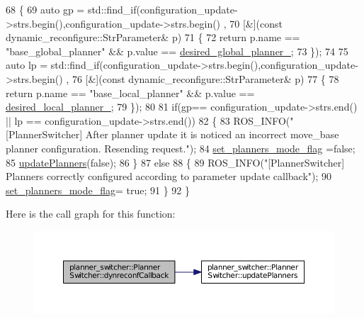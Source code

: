 \begin{DoxyCode}
68 \{
69   \textcolor{keyword}{auto} gp = std::find\_if(configuration\_update->strs.begin(),configuration\_update->strs.begin() ,
70               [&](\textcolor{keyword}{const} dynamic\_reconfigure::StrParameter& p)
71               \{
72                   \textcolor{keywordflow}{return} p.name == \textcolor{stringliteral}{"base\_global\_planner"} &&  p.value == 
      \hyperlink{classplanner__switcher_1_1PlannerSwitcher_a5366081108ad08665549439b00902c58}{desired\_global\_planner\_};
73               \});
74 
75   \textcolor{keyword}{auto} lp = std::find\_if(configuration\_update->strs.begin(),configuration\_update->strs.begin() ,
76               [&](\textcolor{keyword}{const} dynamic\_reconfigure::StrParameter& p)
77               \{
78                 \textcolor{keywordflow}{return} p.name == \textcolor{stringliteral}{"base\_local\_planner"} &&  p.value == 
      \hyperlink{classplanner__switcher_1_1PlannerSwitcher_a112b2460ae1846c796d66d77288b6104}{desired\_local\_planner\_};
79               \});
80 
81   \textcolor{keywordflow}{if}(gp== configuration\_update->strs.end() ||  lp == configuration\_update->strs.end())
82     \{
83       ROS\_INFO(\textcolor{stringliteral}{"[PlannerSwitcher] After planner update it is noticed an incorrect move\_base planner
       configuration. Resending request."});
84       \hyperlink{classplanner__switcher_1_1PlannerSwitcher_ac11d8cdbf44c99c21d3405d32f00a041}{set\_planners\_mode\_flag} =\textcolor{keyword}{false};
85       \hyperlink{classplanner__switcher_1_1PlannerSwitcher_a6832bfbe3acdb77705c83e2f1ec467d2}{updatePlanners}(\textcolor{keyword}{false});
86     \}
87     \textcolor{keywordflow}{else}
88     \{
89       ROS\_INFO(\textcolor{stringliteral}{"[PlannerSwitcher] Planners correctly configured according to parameter update callback"});
90       \hyperlink{classplanner__switcher_1_1PlannerSwitcher_ac11d8cdbf44c99c21d3405d32f00a041}{set\_planners\_mode\_flag}= \textcolor{keyword}{true};
91     \}
92 \}
\end{DoxyCode}


Here is the call graph for this function\+:
\nopagebreak
\begin{figure}[H]
\begin{center}
\leavevmode
\includegraphics[width=350pt]{classplanner__switcher_1_1PlannerSwitcher_aaf671814dd2a9880194eb120a61574bd_cgraph}
\end{center}
\end{figure}




